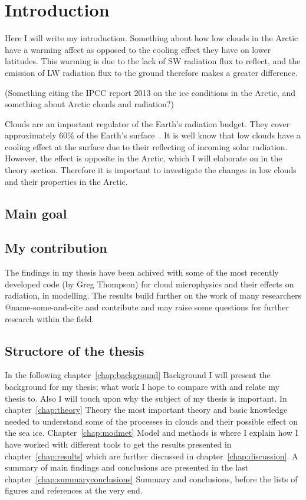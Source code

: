 \chapter{Introduction}
\label{chap:introduction}
Here I will write my introduction.
Something about how low clouds in the Arctic have a warming affect as opposed to the cooling effect they have on lower latitudes. This warming is due to the lack of SW radiation flux to reflect, and the emission of LW radiation flux to the ground therefore makes a greater difference.

(Something citing the IPCC report 2013 on the ice conditions in the Arctic, and something about Arctic clouds and radiation?)

Clouds are an important regulator of the Earth's radiation budget. They cover approximately 60\% of the Earth's surface~\citep{Lohmann2005}. It is well know that low clouds have a cooling effect at the surface due to their reflecting of incoming solar radiation. However, the effect is opposite in the Arctic, which I will elaborate on in the theory section. Therefore it is important to investigate the changes in low clouds and their properties in the Arctic.

\section{Main goal}
\section{My contribution}
The findings in my thesis have been achived with some of the most recently developed code (by Greg Thompson) for cloud microphysics and their effects on radiation, in modelling. The results build further on the work of many researchers @name-some-and-cite and contribute and may raise some questions for further research within the field.

\section{Structore of the thesis}
In the following chapter~\ref{chap:background} Background I will present the background for my thesis; what work I hope to compare with and relate my thesis to. Also I will touch upon why the subject of my thesis is important. In chapter~\ref{chap:theory} Theory the most important theory and basic knowledge needed to understand some of the processes in clouds and their possible effect on the sea ice. Chapter~\ref{chap:modmet} Model and methods is where I explain how I have worked with different tools to get the results presented in chapter~\ref{chap:results} which are further discussed in chapter~\ref{chap:discussion}. A summary of main findings and conclusions are presented in the last chapter~\ref{chap:summaryconclusions} Summary and conclusions, before the lists of figures and references at the very end.

